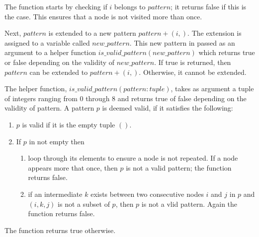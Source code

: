 \documentclass[12pt]{article}
\theoremstyle{definition}
\begin{document}
The function starts by checking if $i$ belongs to $pattern$; it returns false if this is the case. This ensures
that a node is not visited more than once.

Next, $pattern$ is extended to a new pattern $pattern + (i,)$. The extension is assigned to a variable called $new\_pattern$. This new pattern in passed as an argument to a helper 
function $is\_valid\_pattern(new\_pattern)$ which returns true or false depending on the validity of $new\_pattern$. If true is returned, then $pattern$ can be extended to $pattern + (i,)$. Otherwise, it cannot be extended.


The helper function, $is\_valid\_pattern(pattern: tuple)$, takes as argument a tuple of integers ranging from 0 through 8 and returns true of false depending on the validity of pattern.
A pattern $p$ is deemed valid, if it satisfies the following:
\begin{enumerate}
    \item $p$ is valid if it is the empty tuple $()$.
    \item If $p$ in not empty then
    \begin{enumerate}
        \item loop through its elements to ensure a node is not repeated. If a node appears more that once, then $p$ is 
         not a valid pattern; the function returns false.
        \item if an intermediate $k$ exists between two consecutive nodes $i$ and $j$ in $p$ and $(i, k, j)$ is not a subset of $p$,
         then $p$ is not a vlid pattern. Again the function returns false.
    \end{enumerate} 
\end{enumerate}
The function returns true otherwise.
\end{document}
